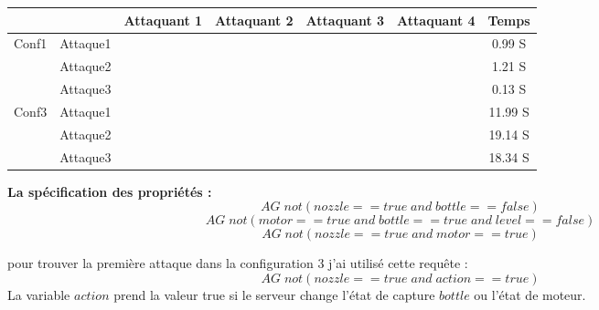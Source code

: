 \documentclass[10pt,a4paper]{article}
\newcommand{\cmark}{\ding{51}}%
\newcommand{\xmark}{\ding{55}}%
\begin{document}
\small
\begin{tabular}{ll|c|c|c|c|c|}
\cline{3-7}
&  &  Attaquant 1 &  Attaquant 2 &  Attaquant 3 & Attaquant 4 & Temps  \\ \hline
\multicolumn{1}{|l|}{\multirow{3}{*}{Conf1}} & Attaque1 &  \color{green}{\cmark} & \color{green}{\cmark} & \color{green}{\cmark} & \color{red}{\xmark}  & 0.99 S  \\ \cline{2-7} 
\multicolumn{1}{|l|}{}& Attaque2 & \color{green}{\cmark} & \color{green}{\cmark} & \color{green}{\cmark} & \color{red}{\xmark} & 1.21 S  \\ \cline{2-7} 
\multicolumn{1}{|l|}{}& Attaque3 & \color{green}{\cmark} & \color{red}{\xmark} & \color{green}{\cmark} & \color{red}{\xmark} & 0.13 S  \\ \hline
\multicolumn{1}{|l|}{\multirow{3}{*}{Conf3}} & Attaque1 & \color{green}{\cmark} & \color{green}{\cmark} & \color{red}{\xmark} & \color{red}{\xmark} &  11.99 S\\ \cline{2-7} 
\multicolumn{1}{|l|}{}& Attaque2 & \color{green}{\cmark} & \color{red}{\xmark} & \color{red}{\xmark} & \color{red}{\xmark} & 19.14 S  \\ \cline{2-7} 
\multicolumn{1}{|l|}{}& Attaque3 & \color{green}{\cmark} & \color{red}{\xmark} & \color{red}{\xmark} & \color{red}{\xmark} & 18.34  S \\ \hline
\end{tabular}
\medskip

\textbf{La spécification des propriétés :}
\begin{equation}
AG\; not(nozzle==true\; and\; bottle==false)
\end{equation}
\begin{equation}
AG\; not(motor==true\; and\; bottle==true\; and\; level==false)
\end{equation}
\begin{equation}
AG\; not(nozzle==true \; and\; motor==true)
\end{equation}
\medskip

pour trouver la première attaque dans la configuration 3 j'ai utilisé cette requête : 
\[AG\; not(nozzle==true\; and\; action==true)\]
La variable $action$ prend la valeur true si le serveur change l'état de capture $bottle$ ou l'état de moteur.
\end{document}
